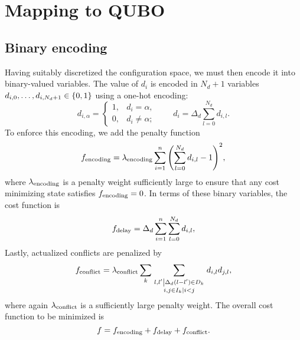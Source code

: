 \section{Mapping to QUBO}

\subsection{Binary encoding}
Having suitably discretized the configuration space, we must then encode it into binary-valued variables.
The value of $d_i$ is encoded in $N_d + 1$ variables $d_{i,0}, \ldots, d_{i,N_d + 1} \in {\{0, 1\}}$ using a one-hot encoding:
\begin{equation}
d_{i, \alpha} = \begin{cases}
1, & d_i = \alpha,\\
0, & d_i \neq \alpha;
\end{cases}
\qquad
d_i = \Delta_d \sum_{l = 0}^{N_d} d_{i,l}.
\end{equation}
To enforce this encoding, we add the penalty function
\begin{equation}
f_{\mathrm{encoding}} = 
\lambda_{\mathrm{encoding}} 
\sum_{i = 1}^n 
{\left(
\sum_{l = 0}^{N_d} d_{i,l} - 1
\right)}^2,
\end{equation}
where $\lambda_{\mathrm{encoding}}$ is a penalty weight sufficiently large to ensure that any cost minimizing state satisfies $f_{\mathrm{encoding}} = 0$.
In terms of these binary variables, the cost function is 
\begin{equation}
f_{\mathrm{delay}} = 
\Delta_d
\sum_{i=1}^n 
\sum_{l=0}^{N_d} d_{i,l},
\end{equation}
Lastly, actualized conflicts are penalized by 
\begin{equation}
  f_{\mathrm{conflict}}
=
\lambda_{\mathrm{conflict}}
\sum_{k}
\sum_{\substack{\left.l, l' \middle| \Delta_d (l - l') \in D_k\right.\\
\left. i, j \in I_k \middle| i < j \right.}}
  d_{i,l} d_{j, l},
\end{equation}
where again $\lambda_{\mathrm{conflict}}$ is a sufficiently large penalty weight. 
The overall cost function to be minimized is 
\begin{equation}
f
=
f_{\mathrm{encoding}} + f_{\mathrm{delay}} + f_{\mathrm{conflict}}.
\end{equation}


